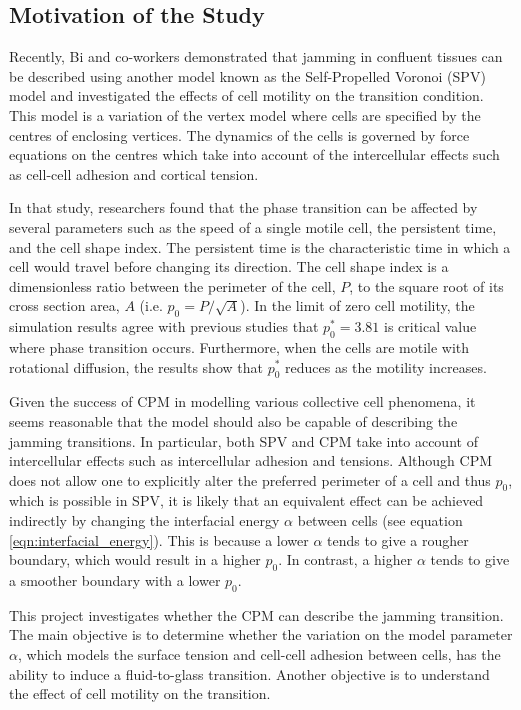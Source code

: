 \documentclass[a4paper,12pt]{article}
\begin{document}
\subsection{Motivation of the Study}
Recently, Bi and co-workers demonstrated that jamming in confluent tissues can be described using another model known as the Self-Propelled Voronoi (SPV) model and investigated the effects of cell motility on the transition condition\cite{bimotility-driven2015}. This model is a variation of the vertex model where cells are specified by the centres of enclosing vertices. The dynamics of the cells is governed by force equations on the centres which take into account of the intercellular effects such as cell-cell adhesion and cortical tension.

In that study, researchers found that the phase transition can be affected by several parameters such as the speed of a single motile cell, the persistent time, and the cell shape index. The persistent time is the characteristic time in which a cell would travel before changing its direction. The cell shape index is a dimensionless ratio between the perimeter of the cell, $P$, to the square root of its cross section area, $A$ (i.e. $p_0=P/\sqrt{A}$). In the limit of zero cell motility, the simulation results agree with previous studies that $p_0^*=3.81$ is critical value where phase transition occurs. Furthermore, when the cells are motile with rotational diffusion, the results show that $p_0^*$ reduces as the motility increases.  

Given the success of CPM in modelling various collective cell phenomena, it seems reasonable that the model should also be capable of describing the jamming transitions. In particular, both SPV and CPM take into account of intercellular effects such as intercellular adhesion and tensions. Although CPM does not allow one to explicitly alter the preferred perimeter of a cell and thus $p_0$, which is possible in SPV, it is likely that an equivalent effect can be achieved indirectly by changing the interfacial energy $\alpha$ between cells (see equation \ref{eqn:interfacial_energy}). This is because a lower $\alpha$ tends to give a rougher boundary, which would result in a higher $p_0$. In contrast, a higher $\alpha$ tends to give a smoother boundary with a lower $p_0$. 

This project investigates whether the CPM can describe the jamming transition. The main objective is to determine whether the variation on the model parameter $\alpha$, which models the surface tension and cell-cell adhesion between cells, has the ability to induce a fluid-to-glass transition. Another objective is to understand the effect of cell motility on the transition. 
\end{document}
